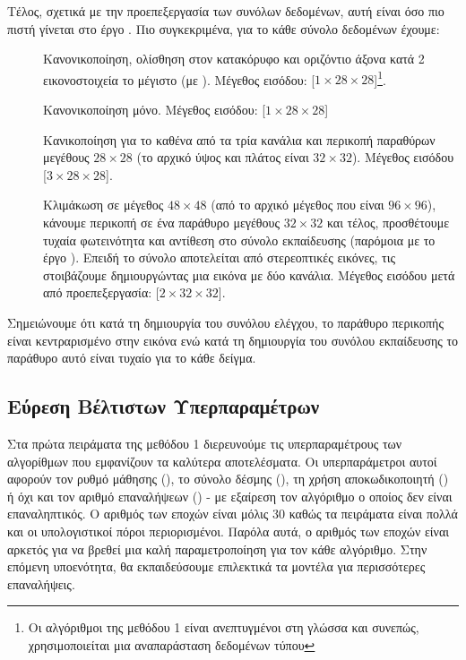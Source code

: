 Τέλος, σχετικά με την προεπεξεργασία των συνόλων δεδομένων, αυτή είναι όσο πιο πιστή γίνεται στο έργο \cite{sabour2017dynamic}. Πιο συγκεκριμένα, για το κάθε σύνολο δεδομένων έχουμε:
\begin{description}
    \item[] Κανονικοποίηση, ολίσθηση στον κατακόρυφο και οριζόντιο άξονα κατά 2 εικονοστοιχεία το μέγιστο (με ). Μέγεθος εισόδου: [$1 \times 28 \times 28$]\footnote{Οι αλγόριθμοι της μεθόδου 1 είναι ανεπτυγμένοι στη γλώσσα  και συνεπώς, χρησιμοποιείται μια αναπαράσταση δεδομένων τύπου }.
    \item[] Κανονικοποίηση μόνο. Μέγεθος εισόδου: [$1 \times 28 \times 28$]
    \item[] Κανικοποίηση για το καθένα από τα τρία κανάλια και περικοπή παραθύρων μεγέθους $28 \times 28$ (το αρχικό ύψος και πλάτος είναι $32 \times 32$). Μέγεθος εισόδου [$3 \times 28 \times 28$].
    \item[] Κλιμάκωση σε μέγεθος $48 \times 48$ (από το αρχικό μέγεθος που είναι $96 \times 96$), κάνουμε περικοπή σε ένα παράθυρο μεγέθους $32 \times 32$ και τέλος, προσθέτουμε τυχαία φωτεινότητα και αντίθεση στο σύνολο εκπαίδευσης (παρόμοια με το έργο \cite{hinton2018matrix}). Επειδή το σύνολο αποτελείται από στερεοπτικές εικόνες, τις στοιβάζουμε δημιουργώντας μια εικόνα με δύο κανάλια. Μέγεθος εισόδου μετά από προεπεξεργασία: [$2 \times 32 \times 32$].
\end{description} 
Σημειώνουμε ότι κατά τη δημιουργία του συνόλου ελέγχου, το παράθυρο περικοπής είναι κεντραρισμένο στην εικόνα ενώ κατά τη δημιουργία του συνόλου εκπαίδευσης το παράθυρο αυτό είναι τυχαίο για το κάθε δείγμα.

\subsection{Εύρεση Βέλτιστων Υπερπαραμέτρων}

Στα πρώτα πειράματα της μεθόδου 1 διερευνούμε τις υπερπαραμέτρους των αλγορίθμων που εμφανίζουν τα καλύτερα αποτελέσματα. Οι υπερπαράμετροι αυτοί αφορούν τον ρυθμό μάθησης (), το σύνολο δέσμης (), τη χρήση αποκωδικοποιητή () ή όχι και τον αριθμό επαναλήψεων () - με εξαίρεση τον αλγόριθμο  ο οποίος δεν είναι επαναληπτικός. Ο αριθμός των εποχών είναι μόλις 30 καθώς τα πειράματα είναι πολλά και οι υπολογιστικοί πόροι περιορισμένοι. Παρόλα αυτά, ο αριθμός των εποχών είναι αρκετός για να βρεθεί μια καλή παραμετροποίηση για τον κάθε αλγόριθμο. Στην επόμενη υποενότητα, θα εκπαιδεύσουμε επιλεκτικά τα μοντέλα για περισσότερες επαναλήψεις. 

